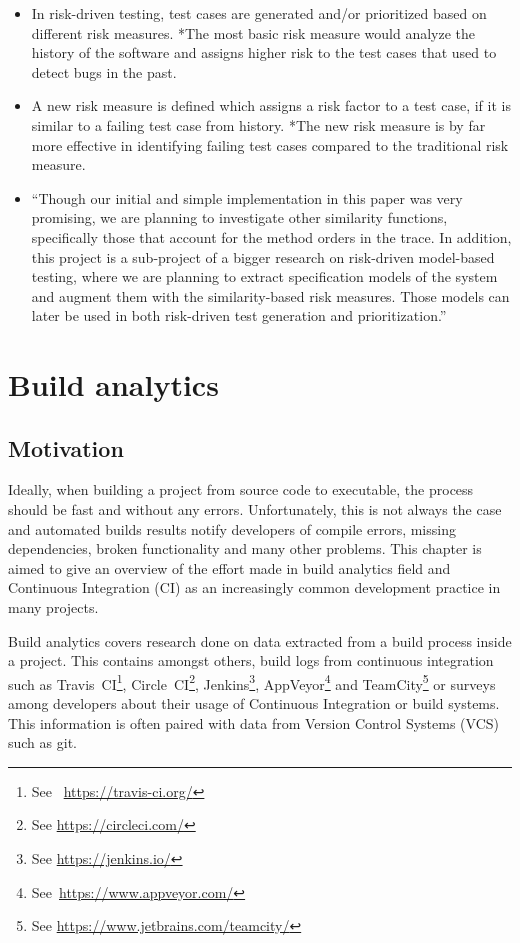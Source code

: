 \documentclass[]{book}
\providecommand{\tightlist}{%
  \setlength{\itemsep}{0pt}\setlength{\parskip}{0pt}}
\let\rmarkdownfootnote\footnote%
\def\footnote{\protect\rmarkdownfootnote}
\begin{document}
\begin{itemize}
\tightlist
\item
  In risk-driven testing, test cases are generated and/or prioritized
  based on different risk measures. *The most basic risk measure would
  analyze the history of the software and assigns higher risk to the
  test cases that used to detect bugs in the past.
\item
  A new risk measure is defined which assigns a risk factor to a test
  case, if it is similar to a failing test case from history. *The new
  risk measure is by far more effective in identifying failing test
  cases compared to the traditional risk measure.
\item
  ``Though our initial and simple implementation in this paper was very
  promising, we are planning to investigate other similarity functions,
  specifically those that account for the method orders in the trace. In
  addition, this project is a sub-project of a bigger research on
  risk-driven model-based testing, where we are planning to extract
  specification models of the system and augment them with the
  similarity-based risk measures. Those models can later be used in both
  risk-driven test generation and prioritization.''
\end{itemize}

\chapter{Build analytics}\label{build-analytics}

\section{Motivation}\label{motivation-1}

Ideally, when building a project from source code to executable, the
process should be fast and without any errors. Unfortunately, this is
not always the case and automated builds results notify developers of
compile errors, missing dependencies, broken functionality and many
other problems. This chapter is aimed to give an overview of the effort
made in build analytics field and Continuous Integration (CI) as an
increasingly common development practice in many projects.

Build analytics covers research done on data extracted from a build
process inside a project. This contains amongst others, build logs from
continuous integration such as Travis~CI\footnote{See~
  \url{https://travis-ci.org/}}, Circle~CI\footnote{See
  \url{https://circleci.com/}}, Jenkins\footnote{See
  \url{https://jenkins.io/}}, AppVeyor\footnote{See~\url{https://www.appveyor.com/}}
and TeamCity\footnote{See \url{https://www.jetbrains.com/teamcity/}} or
surveys among developers about their usage of Continuous Integration or
build systems. This information is often paired with data from Version
Control Systems (VCS) such as git.
\end{document}
